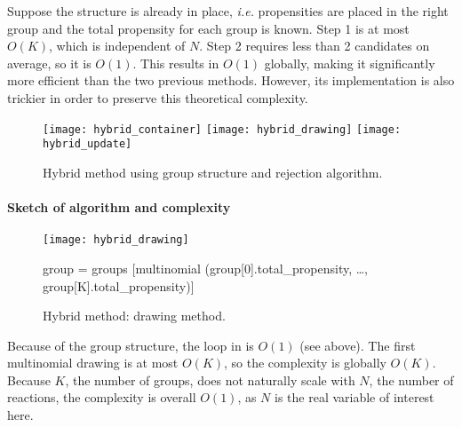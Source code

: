 Suppose the structure is already in place,
\textit{i.e.} propensities are placed in the right group
and the total propensity for each group is known.
Step 1 is at most $O(K)$, which is independent of $N$.
Step 2 requires less than 2 candidates on average, so it is $O(1)$.
This results in $O(1)$ globally, making it significantly more efficient than the two previous methods.
However, its implementation is also trickier in order to preserve this theoretical complexity.

\begin{figure}[!h]
  \centering
  \texttt{[image: hybrid\_container]}
  \texttt{[image: hybrid\_drawing]}
  \texttt{[image: hybrid\_update]}
  \caption{Hybrid method using group structure and rejection algorithm.}
\label{fig:hybrid_method}
\end{figure}

\paragraph{Sketch of algorithm and complexity}

\begin{figure}[!h]
  \centering
  \begin{minipage}{\textwidth}
    \centering
    \texttt{[image: hybrid\_drawing]}
    \begin{algorithm}[H]
      \SetAlgoLined{}
      \KwData{$K+1$ groups, group k containing propensities whose value falls in the interval $(0,b]$ if k=0,
      $(2^{k-1}b, 2^k b]$ if k $>$ 0.
      Propensities are stored as a couple containing their value and original index.}
      group = groups [multinomial (group[0].total\_propensity, \ldots,
        group[K].total\_propensity)]\;
    \end{algorithm}
  \end{minipage}
  \caption{Hybrid method: drawing method.}
\label{fig:hybrid_drawing}
\end{figure}

Because of the group structure, the loop in  is $O(1)$ (see above).
The first multinomial drawing is at most $O(K)$, so the complexity is globally $O(K)$.
Because $K$, the number of groups, does not naturally scale with $N$, the number of reactions,
the complexity is overall $O(1)$, as $N$ is the real variable of interest here.

